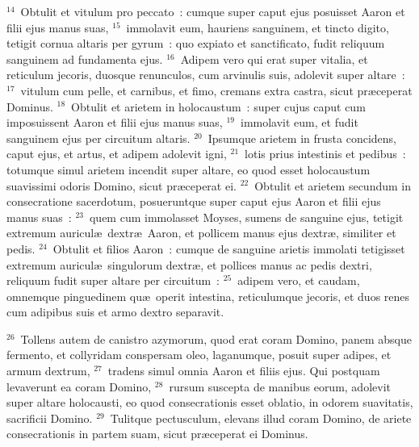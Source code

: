 ${}^{14}$~Obtulit et vitulum pro peccato~: cumque super caput ejus posuisset Aaron et filii ejus manus suas,
${}^{15}$~immolavit eum, hauriens sanguinem, et tincto digito, tetigit cornua altaris per gyrum~: quo expiato et sanctificato, fudit reliquum sanguinem ad fundamenta ejus.
${}^{16}$~Adipem vero qui erat super vitalia, et reticulum jecoris, duosque renunculos, cum arvinulis suis, adolevit super altare~:
${}^{17}$~vitulum cum pelle, et carnibus, et fimo, cremans extra castra, sicut pr\ae ceperat Dominus.
${}^{18}$~Obtulit et arietem in holocaustum~: super cujus caput cum imposuissent Aaron et filii ejus manus suas,
${}^{19}$~immolavit eum, et fudit sanguinem ejus per circuitum altaris.
${}^{20}$~Ipsumque arietem in frusta concidens, caput ejus, et artus, et adipem adolevit igni,
${}^{21}$~lotis prius intestinis et pedibus~: totumque simul arietem incendit super altare, eo quod esset holocaustum suavissimi odoris Domino, sicut pr\ae ceperat ei.
${}^{22}$~Obtulit et arietem secundum in consecratione sacerdotum, posueruntque super caput ejus Aaron et filii ejus manus suas~:
${}^{23}$~quem cum immolasset Moyses, sumens de sanguine ejus, tetigit extremum auricul\ae\ dextr\ae\ Aaron, et pollicem manus ejus dextr\ae , similiter et pedis.
${}^{24}$~Obtulit et filios Aaron~: cumque de sanguine arietis immolati tetigisset extremum auricul\ae\ singulorum dextr\ae , et pollices manus ac pedis dextri, reliquum fudit super altare per circuitum~:
${}^{25}$~adipem vero, et caudam, omnemque pinguedinem qu\ae\ operit intestina, reticulumque jecoris, et duos renes cum adipibus suis et armo dextro separavit.


${}^{26}$~Tollens autem de canistro azymorum, quod erat coram Domino, panem absque fermento, et collyridam conspersam oleo, laganumque, posuit super adipes, et armum dextrum,
${}^{27}$~tradens simul omnia Aaron et filiis ejus. Qui postquam levaverunt ea coram Domino,
${}^{28}$~rursum suscepta de manibus eorum, adolevit super altare holocausti, eo quod consecrationis esset oblatio, in odorem suavitatis, sacrificii Domino.
${}^{29}$~Tulitque pectusculum, elevans illud coram Domino, de ariete consecrationis in partem suam, sicut pr\ae ceperat ei Dominus.



